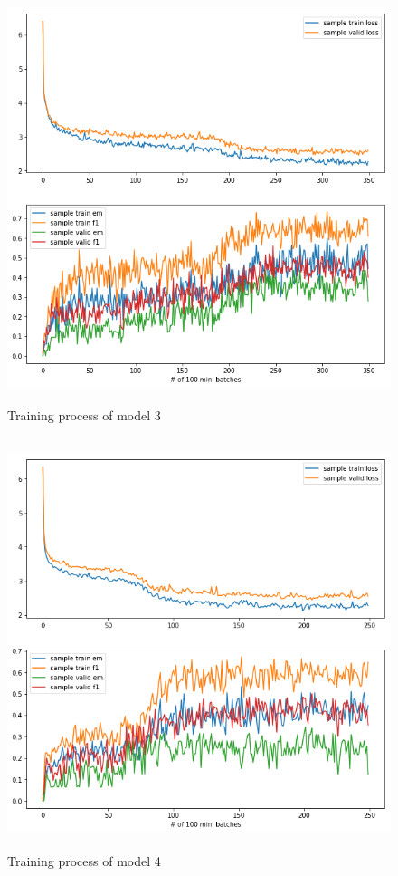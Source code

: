 \documentclass[modernstyle,12pt]{sjsuthesis}
\theoremstyle{definition}
\begin{document}
\begin{figure}[htbp]\centering
  \includegraphics[width=12cm, height=12cm]{figures/match_change1.png}
  \caption{Training process of model 3}
  \label{f:baseline_change1}
\end{figure}

\begin{figure}[htbp]\centering
  \includegraphics[width=12cm, height=12cm]{figures/match_change2.png}
  \caption{Training process of model 4}
  \label{f:baseline_change2}
\end{figure}
\end{document}
